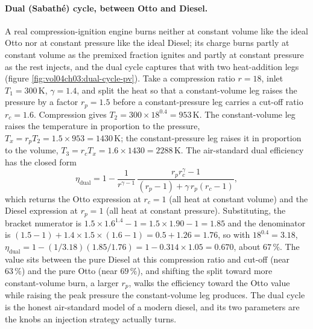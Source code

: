 \paragraph{Dual (Sabath\'e) cycle, between Otto and Diesel.} A real
compression-ignition engine burns neither at constant volume like the ideal
Otto nor at constant pressure like the ideal Diesel; its charge burns partly at
constant volume as the premixed fraction ignites and partly at constant pressure
as the rest injects, and the dual cycle captures that with two heat-addition
legs (figure \ref{fig:vol04ch03:dual-cycle-pv}). Take a compression ratio
$r = 18$, inlet $T_1 = 300\,\si{\kelvin}$, $\gamma = 1.4$, and split the heat so
that a constant-volume leg raises the pressure by a factor $r_p = 1.5$ before a
constant-pressure leg carries a cut-off ratio $r_c = 1.6$. Compression gives
$T_2 = 300 \times 18^{0.4} = 953\,\si{\kelvin}$. The constant-volume leg raises
the temperature in proportion to the pressure, $T_x = r_p T_2 = 1.5 \times 953 =
1430\,\si{\kelvin}$; the constant-pressure leg raises it in proportion to the
volume, $T_3 = r_c T_x = 1.6 \times 1430 = 2288\,\si{\kelvin}$. The air-standard
dual efficiency has the closed form
\[
\eta_{\text{dual}} = 1 - \frac{1}{r^{\gamma-1}}\,
\frac{r_p r_c^\gamma - 1}{(r_p - 1) + \gamma\, r_p (r_c - 1)},
\]
which returns the Otto expression at $r_c = 1$ (all heat at constant volume) and
the Diesel expression at $r_p = 1$ (all heat at constant pressure). Substituting,
the bracket numerator is $1.5 \times 1.6^{1.4} - 1 = 1.5 \times 1.90 - 1 = 1.85$
and the denominator is $(1.5 - 1) + 1.4 \times 1.5 \times (1.6 - 1) = 0.5 + 1.26
= 1.76$, so with $18^{0.4} = 3.18$,
$\eta_{\text{dual}} = 1 - (1/3.18)(1.85/1.76) = 1 - 0.314 \times 1.05 = 0.670$,
about $67\,\%$. The value sits between the pure Diesel at this compression ratio
and cut-off (near $63\,\%$) and the pure Otto (near $69\,\%$), and shifting the
split toward more constant-volume burn, a larger $r_p$, walks the efficiency
toward the Otto value while raising the peak pressure the constant-volume leg
produces. The dual cycle is the honest air-standard model of a modern diesel,
and its two parameters are the knobs an injection strategy actually turns.

